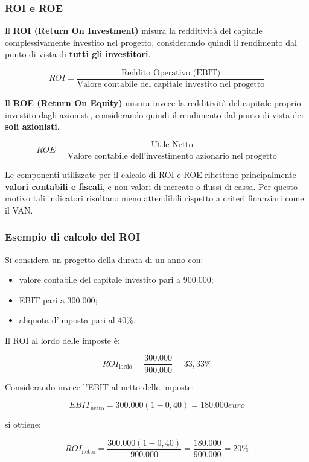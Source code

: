 \subsubsection*{ROI e ROE}

\noindent Il \textbf{ROI (Return On Investment)} misura la redditività del capitale complessivamente 
investito nel progetto, considerando quindi il rendimento dal punto di vista di \textbf{tutti gli investitori}.

\[
\boxed{
ROI =
\frac{\text{Reddito Operativo (EBIT)}}
{\text{Valore contabile del capitale investito nel progetto}}
}
\]

\noindent Il \textbf{ROE (Return On Equity)} misura invece la redditività del capitale proprio investito dagli azionisti, considerando quindi 
il rendimento dal punto di vista dei \textbf{soli azionisti}.

\[
\boxed{
ROE =
\frac{\text{Utile Netto}}
{\text{Valore contabile dell'investimento azionario nel progetto}}
}
\]

\noindent Le componenti utilizzate per il calcolo di ROI e ROE riflettono principalmente \textbf{valori contabili e fiscali}, e 
non valori di mercato o flussi di cassa. Per questo motivo tali indicatori risultano meno attendibili rispetto a criteri finanziari come il VAN.

\subsubsection*{Esempio di calcolo del ROI}

\noindent Si considera un progetto della durata di un anno con:

\begin{itemize}
    \item valore contabile del capitale investito pari a 900.000;
    \item EBIT pari a 300.000;
    \item aliquota d'imposta pari al $40\%$.
\end{itemize}

\noindent Il ROI al lordo delle imposte è:

\[
ROI_{\text{lordo}}
=
\frac{300.000}{900.000}
=
\boxed{33{,}33\%}
\]

\noindent Considerando invece l'EBIT al netto delle imposte:

\[
EBIT_{\text{netto}}
=
300.000(1-0{,}40)
=
180.000 euro
\]

\noindent si ottiene:

\[
ROI_{\text{netto}}
=
\frac{300.000(1-0{,}40)}{900.000}
=
\frac{180.000}{900.000}
=
\boxed{20\%}
\]

